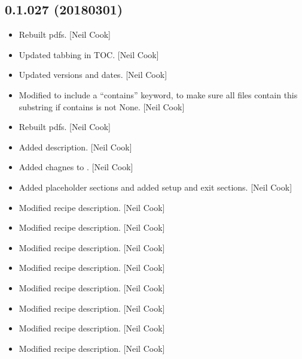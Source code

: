 \documentclass[a4paper,10pt,english]{report}
\begin{document}
\subsection{0.1.027 (2018\sphinxhyphen{}03\sphinxhyphen{}01)}
\label{\detokenize{misc/changelog:id496}}\begin{itemize}
\item {} 
Rebuilt pdfs. {[}Neil Cook{]}

\item {} 
Updated tabbing in TOC. {[}Neil Cook{]}

\item {} 
Updated versions and dates. {[}Neil Cook{]}

\item {} 
Modified  to include a “contains” keyword, to make
sure all files  contain this substring if contains is
not None. {[}Neil Cook{]}

\item {} 
Rebuilt pdfs. {[}Neil Cook{]}

\item {} 
Added description. {[}Neil Cook{]}

\item {} 
Added chagnes to . {[}Neil Cook{]}

\item {} 
Added placeholder sections and added setup and exit sections. {[}Neil
Cook{]}

\item {} 
Modified recipe description. {[}Neil Cook{]}

\item {} 
Modified recipe description. {[}Neil Cook{]}

\item {} 
Modified recipe description. {[}Neil Cook{]}

\item {} 
Modified recipe description. {[}Neil Cook{]}

\item {} 
Modified recipe description. {[}Neil Cook{]}

\item {} 
Modified recipe description. {[}Neil Cook{]}

\item {} 
Modified recipe description. {[}Neil Cook{]}

\item {} 
Modified recipe description. {[}Neil Cook{]}


\end{itemize}
\end{document}
